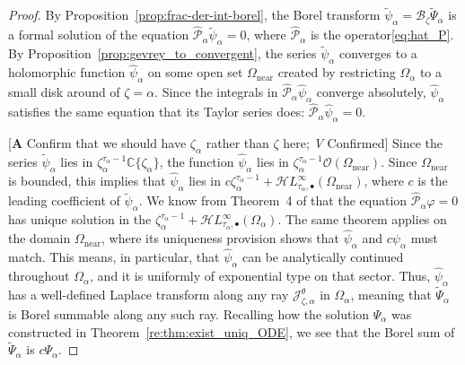 \documentclass{article}
\newcommand{\singexp}[2]{\mathcal{H}L^\infty_{#1, #2}}
\newcommand{\singexpalg}[1]{\singexp{#1}{\bullet}}
\newcommand{\C}{\mathbb{C}}
\newcommand{\series}[1]{\tilde{#1}}
\newcommand{\borel}{\mathcal{B}}
\theoremstyle{definition}
\theoremstyle{plain}
\newenvironment{todo}{\color{Coral}}{\color{black}}
\begin{document}
\begin{proof}
By Proposition~\ref{prop:frac-der-int-borel}, the Borel transform $\series{\psi}_\alpha = \borel_\zeta \series{\Psi}_\alpha$ is a formal solution of the equation $\hat{\mathcal{P}}_\alpha \series{\psi}_\alpha = 0$, where $\hat{\mathcal{P}}_\alpha$ is the operator\eqref{eq:hat_P}. By Proposition~\ref{prop:gevrey_to_convergent}, the series $\series{\psi}_\alpha$ converges to a holomorphic function $\hat{\psi}_\alpha$ on some open set $\Omega_\text{near}$ created by restricting $\Omega_\alpha$ to a small disk around of $\zeta = \alpha$. Since the integrals in $\hat{\mathcal{P}}_\alpha \hat{\psi}_\alpha$ converge absolutely, $\hat{\psi}_\alpha$ satisfies the same equation that its Taylor series does: $\hat{\mathcal{P}}_\alpha \hat{\psi}_\alpha = 0$.

\begin{todo}[\textbf{A} Confirm that we should have $\zeta_\alpha$ rather than $\zeta$ here; \textit{V} Confirmed]\end{todo} Since the series $\series{\psi}_\alpha$ lies in $\zeta_\alpha^{\tau_\alpha-1} \C\{\zeta_\alpha\}$, the function $\hat{\psi}_\alpha$ lies in $\zeta_\alpha^{\tau_\alpha-1} \mathcal{O}(\Omega_\text{near})$. Since $\Omega_\text{near}$ is bounded, this implies that $\hat{\psi}_\alpha$ lies in $c \zeta_\alpha^{\tau_\alpha-1} + \singexpalg{\tau_\alpha}(\Omega_\text{near})$, where $c$ is the leading coefficient of $\series{\psi}_\alpha$. We know from Theorem~4 of \cite{reg-sing-volterra} that the equation $\hat{\mathcal{P}}_\alpha \varphi = 0$ has unique solution in the $\zeta_\alpha^{\tau_\alpha-1} + \singexpalg{\tau_\alpha}(\Omega_\alpha)$. The same theorem applies on the domain $\Omega_\text{near}$, where its uniqueness provision shows that $\hat{\psi}_\alpha$ and $c\psi_\alpha$ must match. This means, in particular, that $\hat{\psi}_\alpha$ can be analytically continued throughout $\Omega_\alpha$, and it is uniformly of exponential type on that sector. Thus, $\hat{\psi}_\alpha$ has a well-defined Laplace transform along any ray $\mathcal{J}^\theta_{\zeta, \alpha}$ in $\Omega_\alpha$, meaning that $\series{\Psi}_\alpha$ is Borel summable along any such ray. Recalling how the solution $\Psi_\alpha$ was constructed in Theorem~\ref{re:thm:exist_uniq_ODE}, we see that the Borel sum of $\series{\Psi}_\alpha$ is $c\Psi_\alpha$.
\end{proof}
\end{document}
